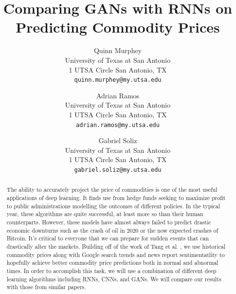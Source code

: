\documentclass[final]{cvpr}
\begin{document}
\title{Comparing GANs with RNNs on Predicting Commodity Prices}

\author{Quinn Murphey\\
University of Texas at San Antonio\\
1 UTSA Circle San Antonio, TX\\
{\tt\small quinn.murphey@my.utsa.edu}
\and
Adrian Ramos\\
University of Texas at San Antonio\\
1 UTSA Circle San Antonio, TX\\
{\tt\small adrian.ramos@my.utsa.edu}

\and
Gabriel Soliz\\
University of Texas at San Antonio\\
1 UTSA Circle San Antonio, TX\\
{\tt\small gabriel.soliz@my.utsa.edu}
}

\maketitle


\begin{abstract}
    The ability to accurately project the price of commodities is one of the
    most useful applications of deep learning. It finds use from hedge funds
    seeking to maximize profit to public administrations modelling the outcomes
    of different policies. In the typical year, these algorithms are quite 
    successful, at least more so than their human counterparts. However, these
    models have almost always failed to predict drastic economic downturns such
    as the crash of oil in 2020 or the now expected crashes of Bitcoin.
    It’s critical to everyone that we can prepare for sudden events that can
    drastically alter the markets. Building off of the work of Tang et al.
    \cite{tang}, we use historical commodity prices along with Google
    search trends and news report sentimentatlity to hopefully achieve better
    commodity price predictions both in normal and abnormal times. In order
    to accomplish this task, we will use a combination of different deep
    learning algorithms including RNNs, CNNs, and GANs. We will compare our
    results with those from similar papers.
\end{abstract}
\end{document}
